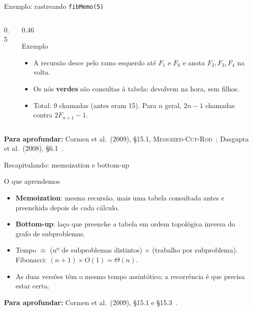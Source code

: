 \documentclass[aspectratio=169,xcolor=table]{beamer}
\newcommand{\fonte}[1]{%
  \vfill
  {\tiny\color{gray!55!black}\textbf{Para aprofundar:} #1\par}%
}
\begin{document}
\begin{frame}{Exemplo: rastreando \texttt{fibMemo(5)}}
  \begin{columns}[c]
    \begin{column}{0.5\textwidth}
      \centering
    \end{column}
    \begin{column}{0.46\textwidth}
      \begin{exampleblock}{Exemplo}
        \scriptsize
        \begin{itemize}\scriptsize
          \item A recursão desce pelo ramo esquerdo até $F_1$ e $F_0$ e anota
                $F_2, F_3, F_4$ na volta.
          \item Os nós \textcolor{green!50!black}{\textbf{verdes}} são consultas à tabela:
                devolvem na hora, sem filhos.
          \item Total: 9 chamadas (antes eram 15). Para $n$ geral, $2n-1$ chamadas
                contra $2F_{n+1}-1$.
        \end{itemize}
      \end{exampleblock}
    \end{column}
  \end{columns}
  \fonte{Cormen et al.\ (2009), \S 15.1, \textsc{Memoized-Cut-Rod}~\cite{cormen2009introduction};
    Dasgupta et al.\ (2008), \S 6.1~\cite{dasgupta2008algorithms}.}
\end{frame}

\begin{frame}{Recapitulando: memoization e bottom-up}
  \begin{block}{O que aprendemos}
    \begin{itemize}\scriptsize
      \item \textbf{Memoization}: mesma recursão, mais uma tabela consultada antes e
            preenchida depois de cada cálculo.
      \item \textbf{Bottom-up}: laço que preenche a tabela em ordem topológica inversa do
            grafo de subproblemas.
      \item Tempo $\approx$ (nº de subproblemas distintos) $\times$ (trabalho por
            subproblema). Fibonacci: $(n+1)\times O(1) = \Theta(n)$.
      \item As duas versões têm o mesmo tempo assintótico; a recorrência é que precisa
            estar certa.
    \end{itemize}
  \end{block}
  \fonte{Cormen et al.\ (2009), \S 15.1 e \S 15.3~\cite{cormen2009introduction}.}
\end{frame}
\end{document}
